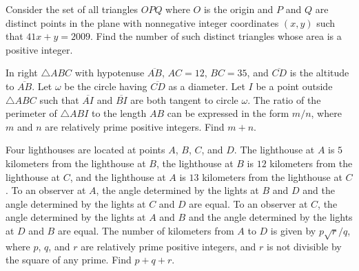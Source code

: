 \documentclass[11pt]{article}
\theoremstyle{definition}
\begin{document}
\begin{question}[name={2009 AIME I, \href{https://artofproblemsolving.com/community/c4p1439455}{Problem 11}}]
	Consider the set of all triangles $ OPQ$ where $ O$ is the origin and $ P$ and $ Q$ are distinct points in the plane with nonnegative integer coordinates $ (x,y)$ such that $ 41x+y = 2009$. Find the number of such distinct triangles whose area is a positive integer.
\end{question}


%	












\begin{question}[name={2009 AIME I, \href{https://artofproblemsolving.com/community/c4p1439446}{Problem 12}}]
	In right $ \triangle ABC$ with hypotenuse $ \overline{AB}$, $ AC = 12$, $ BC = 35$, and $ \overline{CD}$ is the altitude to $ \overline{AB}$. Let $ \omega$ be the circle having $ \overline{CD}$ as a diameter. Let $ I$ be a point outside $ \triangle ABC$ such that $ \overline{AI}$ and $ \overline{BI}$ are both tangent to circle $ \omega$. The ratio of the perimeter of $ \triangle ABI$ to the length $ AB$ can be expressed in the form $ {m}/{n}$, where $ m$ and $ n$ are relatively prime positive integers. Find $ m+n$.	
\end{question}


%	














\begin{question}[name={2009 AIME II, \href{https://artofproblemsolving.com/community/c4p1455388}{Problem 10}}]
	Four lighthouses are located at points $ A$, $ B$, $ C$, and $ D$. The lighthouse at $ A$ is $ 5$ kilometers from the lighthouse at $ B$, the lighthouse at $ B$ is $ 12$ kilometers from the lighthouse at $ C$, and the lighthouse at $ A$ is $ 13$ kilometers from the lighthouse at $ C$. To an observer at $ A$, the angle determined by the lights at $ B$ and $ D$ and the angle determined by the lights at $ C$ and $ D$ are equal. To an observer at $ C$, the angle determined by the lights at $ A$ and $ B$ and the angle determined by the lights at $ D$ and $ B$ are equal. The number of kilometers from $ A$ to $ D$ is given by $ {p\sqrt{r}}/{q}$, where $ p$, $ q$, and $ r$ are relatively prime positive integers, and $ r$ is not divisible by the square of any prime. Find $p+q+r$.
\end{question}
\end{document}

